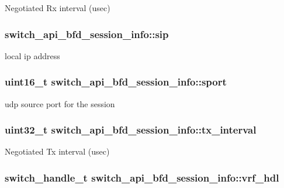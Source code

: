 Negotiated Rx interval (usec) \hypertarget{structswitch__api__bfd__session__info_ac8b7c870da240ba95d21affa1727ae57}{
\subsubsection[{sip}]{ switch\+\_\+api\+\_\+bfd\+\_\+session\+\_\+info\+::sip}}\label{structswitch__api__bfd__session__info_ac8b7c870da240ba95d21affa1727ae57}
local ip address \hypertarget{structswitch__api__bfd__session__info_a25987feaccc3974b3fa9c5112b514b85}{
\subsubsection[{sport}]{\setlength{\rightskip}{0pt plus 5cm}uint16\+\_\+t switch\+\_\+api\+\_\+bfd\+\_\+session\+\_\+info\+::sport}}\label{structswitch__api__bfd__session__info_a25987feaccc3974b3fa9c5112b514b85}
udp source port for the session \hypertarget{structswitch__api__bfd__session__info_a25c3bac5a8d2edf26f2d404721228866}{
\subsubsection[{tx\+\_\+interval}]{\setlength{\rightskip}{0pt plus 5cm}uint32\+\_\+t switch\+\_\+api\+\_\+bfd\+\_\+session\+\_\+info\+::tx\+\_\+interval}}\label{structswitch__api__bfd__session__info_a25c3bac5a8d2edf26f2d404721228866}
Negotiated Tx interval (usec) \hypertarget{structswitch__api__bfd__session__info_a44268bd41e465160f25d4bcd494550fa}{
\subsubsection[{vrf\+\_\+hdl}]{\setlength{\rightskip}{0pt plus 5cm}switch\+\_\+handle\+\_\+t switch\+\_\+api\+\_\+bfd\+\_\+session\+\_\+info\+::vrf\+\_\+hdl}}\label{structswitch__api__bfd__session__info_a44268bd41e465160f25d4bcd494550fa}
